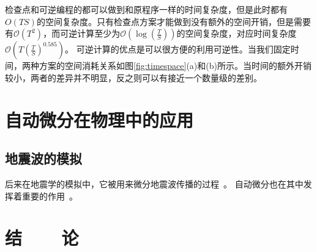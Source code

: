 \documentclass[A4,twoside,fontset=ubuntu,UTF8]{ctexart}
\newcommand{\bigO}{{\mathcal{O}}}
\begin{document}
检查点和可逆编程的都可以做到和原程序一样的时间复杂度，但是此时都有$O(TS)$的空间复杂度。只有检查点方案才能做到没有额外的空间开销，但是需要有$\bigO(T^2)$，而可逆计算至少为$\bigO(\log(\frac{T}{S}))$的空间复杂度，对应时间复杂度$\bigO(T(\frac{T}{S})^{0.585})$。
可逆计算的优点是可以很方便的利用可逆性。当我们固定时间，两种方案的空间消耗关系如图\ref{fig:timespace}(a)和(b)所示。当时间的额外开销较小，两者的差异并不明显，反之则可以有接近一个数量级的差别。

\section{自动微分在物理中的应用}\label{sec:applications}
\baselineskip
\subsection{地震波的模拟}
后来在地震学的模拟中，它被用来微分地震波传播的过程~\cite{Symes2007}。
自动微分也在其中发挥着重要的作用~\cite{Zhu2020}。

\baselineskip

\section{结~~~~论}
\end{document}
